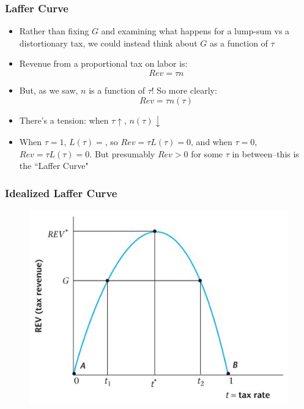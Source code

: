 \documentclass{beamer}
\begin{document}
\begin{frame}
\frametitle[alignment=center]{Laffer Curve}
\begin{itemize}
\item Rather than fixing $G$ and examining what happens for a lump-sum vs a distortionary tax, we could instead think about $G$ as a function of $\tau$
\bigskip
\item Revenue from a proportional tax on labor is: 
$$Rev=\tau n$$
\item But, as we saw, $n$ is a function of $\tau$!  So more clearly:
$$Rev=\tau n(\tau)$$
\item There's a tension: when $\tau\uparrow$, $n(\tau)\downarrow$
\bigskip
\item When $\tau=1$, $L(\tau)=$, so $Rev=\tau L(\tau)=0$, and when $\tau=0$, $Rev=\tau L(\tau)=0$.  But presumably $Rev>0$ for some $\tau$ in between--this is the ``Laffer Curve"
\end{itemize}
\end{frame}

\begin{frame}
\frametitle[alignment=center]{Idealized Laffer Curve}
\begin{figure}
\centering
\includegraphics[scale=0.5]{Figures/W_Fig_5pt17.png}
\end{figure}
\end{frame}
\end{document}

